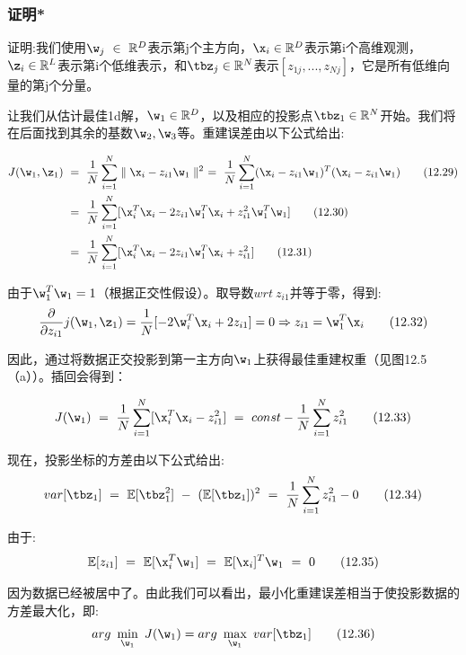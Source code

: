 \documentclass[a4paper]{article}
\begin{document}
\subsubsection{证明* }

证明:我们使用$\w_j\ \in \ \mathbb{R}^D$表示第j个主方向，$\x_i\in\mathbb{R}^D$表示第i个高维观测，$\z_i\in\mathbb{R}^L$表示第i个低维表示，和$\tbz_j\in\mathbb{R}^N$表示$[z_{1j},...,z_{Nj}]$，它是所有低维向量的第j个分量。 

让我们从估计最佳1d解，$\w_1\in\mathbb{R}^D$，以及相应的投影点$\tbz_1\in\mathbb{R}^N$开始。我们将在后面找到其余的基数$\w_2,\w_3$等。重建误差由以下公式给出:

\begin{align}
	J(\w_1,\z_1)\ &=\ \frac{1}{N}\sum_{i=1}^{N}\parallel\x_i-z_{i1}\w_1\parallel^2\ =\ \frac{1}{N}\sum_{i=1}^{N}(\x_i-z_{i1}\w_1)^T(\x_i-z_{i1}\w_1)\tag{12.29}\\
	&=\ \frac{1}{N}\sum_{i=1}^{N}[\x_i^T\x_i-2z_{i1}\w_1^T\x_i+z_{i1}^2\w_1^T\w_1]\tag{12.30}\\
	&=\ \frac{1}{N}\sum_{i=1}^{N}[\x_i^T\x_i-2z_{i1}\w_1^T\x_i+z_{i1}^2]\tag{12.31}\\
\end{align}

由于$\w_1^T\w_1=1$（根据正交性假设）。取导数$wrt\ z_{i1}$并等于零，得到:
\begin{equation}
	\dfrac{\partial}{\partial z_{i1}}j(\w_1,\z_1)=\frac{1}{N}[-2\w_i^T\x_i+2z_{i1}]=0\Rightarrow z_{i1}=\w_1^T\x_i\tag{12.32}
\end{equation}

因此，通过将数据正交投影到第一主方向$\w_1$上获得最佳重建权重（见图12.5（a））。插回会得到：

\begin{equation}
	J(\w_1)\ =\ \frac{1}{N}\sum_{i=1}^{N}[\x_i^T\x_i-z_{i1}^2]\ =\ const-\frac{1}{N}\sum_{i=1}^{N}z_{i1}^2\tag{12.33}
\end{equation}

现在，投影坐标的方差由以下公式给出:
\begin{equation}
	var[\tbz_1]\ =\ \mathbb{E}[\tbz_1^2]\ -\ (\mathbb{E}[\tbz_1])^2\ =\ \frac{1}{N}\sum_{i=1}^{N}z_{i1}^2-0\tag{12.34}
\end{equation}

由于:
\begin{equation}
	\mathbb{E}[z_{i1}]\ =\ \mathbb{E}[\x_i^T\w_1]\ =\ \mathbb{E}[\x_i]^T\w_1\ =\ 0\tag{12.35}
\end{equation}

因为数据已经被居中了。由此我们可以看出，最小化重建误差相当于使投影数据的方差最大化，即:
\begin{equation}
	arg\ \min_{\w_1}\ J(\w_1)=arg\ \max_{\w_1}\ var[\tbz_1]  \tag{12.36}
\end{equation}
\end{document}
